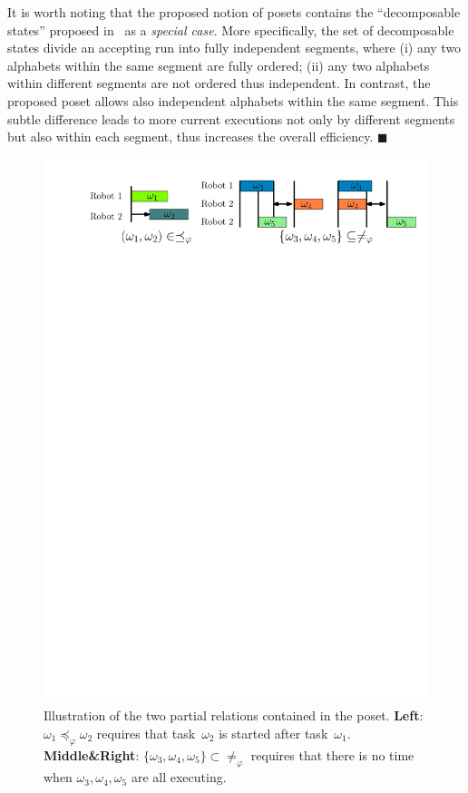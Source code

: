 \begin{remark}\label{remark:compare-poset}
It is worth noting that the proposed notion of posets contains
the ``decomposable states'' proposed in~\cite{schillinger2018simultaneous}
as a \emph{special case}.
More specifically, the set of decomposable states divide an accepting run into
fully independent segments, where
(i) any two alphabets within the same segment are fully ordered;
(ii) any two alphabets within different segments are not ordered thus independent.
In contrast, the proposed poset allows also independent alphabets within the
same segment.
This subtle difference leads to more current executions not only by
different segments but also within each segment,
thus increases the overall efficiency. \hfill $\blacksquare$
\end{remark}
\begin{figure}[t!]
\includegraphics[width=0.95\linewidth]{figures/poset_graph2.pdf}
\centering
\caption{Illustration of the two partial relations
        contained in the poset.
        \textbf{Left}: $\omega_1\preceq_{\varphi} \omega_2$ requires that
task~$\omega_2$ is started after task~$\omega_1$.
\textbf{Middle\&Right}:
$\{\omega_3,\omega_4,\omega_5\}\subset\neq_{\varphi}$
requires that there is no time when
$\omega_3,\omega_4,\omega_5$ are all executing.}
\label{fig:partial}
\end{figure}

